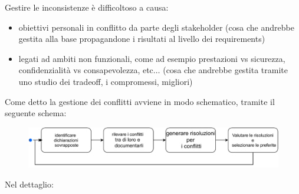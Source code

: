 \documentclass[a4paper,12pt, oneside]{book}
\begin{document}
Gestire le inconsistenze è difficoltoso a causa:
\begin{itemize}
  \item obiettivi personali in conflitto da parte degli stakeholder (cosa che
  andrebbe gestita alla base propagandone i risultati al livello dei
  requirements)
  \item legati ad ambiti non funzionali, come ad esempio prestazioni vs
  sicurezza, confidenzialità vs consapevolezza, etc$\ldots$ (cosa che andrebbe
  gestita tramite uno studio dei tradeoff, i compromessi, migliori) 
\end{itemize}
Come detto la gestione dei conflitti avviene in modo schematico, tramite il
seguente schema:
\begin{figure}[H]
  \centering
  \includegraphics[scale = 0.6]{img/re5.pdf}
\end{figure}
Nel dettaglio:
\end{document}
